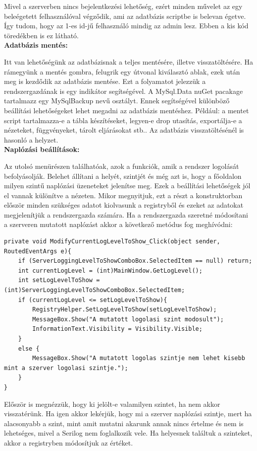 \documentclass[
]{thesis-ekf}
\theoremstyle{definition}
\theoremstyle{remark}
\begin{document}
Mivel a szerverben nincs bejelentkezési lehetőség, ezért minden művelet az egy beleégetett felhasználóval végződik, ami az adatbázis scriptbe is belevan égetve. Így tudom, hogy az 1-es id-jű felhasználó mindig az admin lesz. Ebben a kis kód töredékben is ez látható.\\
\textbf{Adatbázis mentés: }

Itt van lehetőségünk az adatbázisnak a teljes mentésére, illetve visszatöltésére. Ha rámegyünk a mentés gombra, felugrik egy útvonal kiválasztó ablak, ezek után meg is kezdődik az adatbázis mentése. Ezt a folyamatot jelezzük a rendszergazdának is egy indikátor segítségével. A MySql.Data nuGet pacakage tartalmazz egy MySqlBackup nevű osztályt. Ennek segítségével különböző beállítási lehetőségeket lehet megadni az adatbázis mentéshez. Például: a mentet script tartalmazza-e a tábla készítéseket, legyen-e drop utasítás, exportálja-e a nézeteket, függvényeket, tárolt eljárásokat stb.. Az adatbázis visszatöltésénél is hasonló a helyzet.\\
\textbf{Naplózási beállítások: }

Az utolsó menürészen találhatóak, azok a funkciók, amik a rendszer logolását befolyásolják. Belehet állítani a helyét, szintjét és még azt is, hogy a főoldalon milyen szintű naplózási üzeneteket jelenítse meg. Ezek a beállítási lehetőségek jól el vannak különítve a nézeten. Mikor megnyitjuk, ezt a részt a konstruktorban először minden szükséges adatot kiolvasunk a registryből és ezeket az adatokat megjelenítjük a rendszergazda számára. Ha a rendszergazda szeretné módosítani a szerveren mutatott naplózást akkor a következő metódus fog meghívódni:
\begin{lstlisting}[showstringspaces=false, caption={A szerveren mutatott naplózás beállítása.}, captionpos=b]
private void ModifyCurrentLogLevelToShow_Click(object sender, RoutedEventArgs e){
	if (ServerLoggingLevelToShowComboBox.SelectedItem == null) return;
	int currentLogLevel = (int)MainWindow.GetLogLevel();
	int setLogLevelToShow = (int)ServerLoggingLevelToShowComboBox.SelectedItem;
	if (currentLogLevel <= setLogLevelToShow){
		RegistryHelper.SetLogLevelToShow(setLogLevelToShow);
		MessageBox.Show("A mutatott logolasi szint modosult");
		InformationText.Visibility = Visibility.Visible;
	}
	else {
		MessageBox.Show("A mutatott logolas szintje nem lehet kisebb mint a szerver logolasi szintje.");
	}
}
\end{lstlisting}
Először is megnézzük, hogy ki jelölt-e valamilyen szintet, ha nem akkor visszatérünk. Ha igen akkor lekérjük, hogy mi a szerver naplózási szintje, mert ha alacsonyabb a szint, mint amit mutatni akarunk annak nincs értelme és nem is lehetséges, mivel a Serilog nem foglalkozik vele. Ha helyesnek találtuk a szinteket, akkor a registryben módosítjuk az értéket. 
\end{document}
